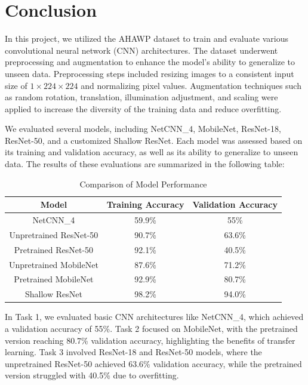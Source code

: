\documentclass[12pt]{article}
\begin{document}
\clearpage

\section*{Conclusion}

In this project, we utilized the AHAWP dataset to train and evaluate various convolutional neural network (CNN) architectures. The dataset underwent preprocessing and augmentation to enhance the model's ability to generalize to unseen data. Preprocessing steps included resizing images to a consistent input size of \(1 \times 224 \times 224\) and normalizing pixel values. Augmentation techniques such as random rotation, translation, illumination adjustment, and scaling were applied to increase the diversity of the training data and reduce overfitting.

We evaluated several models, including NetCNN\_4, MobileNet, ResNet-18, ResNet-50, and a customized Shallow ResNet. Each model was assessed based on its training and validation accuracy, as well as its ability to generalize to unseen data. The results of these evaluations are summarized in the following table:

\begin{table}[ht]
    \centering
    \begin{tabular}{|c|c|c|}
        \hline
        \textbf{Model} & \textbf{Training Accuracy} & \textbf{Validation Accuracy} \\
        \hline
        NetCNN\_4 & 59.9\% & 55\% \\
        \hline
        Unpretrained ResNet-50 & 90.7\% & 63.6\% \\
        \hline
        Pretrained ResNet-50 & 92.1\% & 40.5\% \\
        \hline
        Unpretrained MobileNet & 87.6\% & 71.2\% \\
        \hline
        Pretrained MobileNet & 92.9\% & 80.7\% \\
        \hline
        Shallow ResNet & 98.2\% & 94.0\% \\
        \hline
    \end{tabular}
    \caption{Comparison of Model Performance}
    \label{tab:model_comparison}
\end{table}

In Task 1, we evaluated basic CNN architectures like NetCNN\_4, which achieved a validation accuracy of 55\%. Task 2 focused on MobileNet, with the pretrained version reaching 80.7\% validation accuracy, highlighting the benefits of transfer learning. Task 3 involved ResNet-18 and ResNet-50 models, where the unpretrained ResNet-50 achieved 63.6\% validation accuracy, while the pretrained version struggled with 40.5\% due to overfitting.
\end{document}
